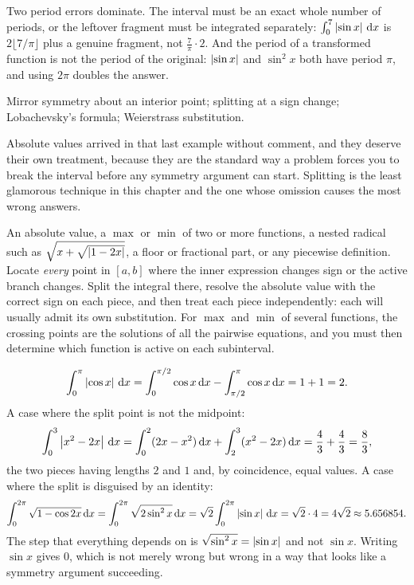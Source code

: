 \begin{trap}
Two period errors dominate. The interval must be an exact whole number of periods, or the leftover fragment must be integrated separately: $\int_0^{7}\left\lvert \sin x\right\rvert\,\mathrm{d} x$ is $2\lfloor7/\pi\rfloor$ plus a genuine fragment, not $\tfrac{7}{\pi}\cdot2$. And the period of a transformed function is not the period of the original: $\left\lvert \sin x\right\rvert$ and $\sin^{2}x$ both have period $\pi$, and using $2\pi$ doubles the answer.
\end{trap}

\begin{seealsob}Mirror symmetry about an interior point; splitting at a sign change; Lobachevsky's formula; Weierstrass substitution.\end{seealsob}

Absolute values arrived in that last example without comment, and they deserve their own treatment, because they are the standard way a problem forces you to break the interval before any symmetry argument can start. Splitting is the least glamorous technique in this chapter and the one whose omission causes the most wrong answers.

\cue An absolute value, a $\max$ or $\min$ of two or more functions, a nested radical such as $\sqrt{x+\sqrt{\left\lvert 1-2x\right\rvert}}$, a floor or fractional part, or any piecewise definition.
\method Locate \emph{every} point in $[a,b]$ where the inner expression changes sign or the active branch changes. Split the integral there, resolve the absolute value with the correct sign on each piece, and then treat each piece independently: each will usually admit its own substitution. For $\max$ and $\min$ of several functions, the crossing points are the solutions of all the pairwise equations, and you must then determine which function is active on each subinterval.

\begin{worked}
\[\int_0^{\pi}\left\lvert \cos x\right\rvert\,\mathrm{d} x=\int_0^{\pi/2}\cos x\,\mathrm{d} x-\int_{\pi/2}^{\pi}\cos x\,\mathrm{d} x=1+1=2.\]
A case where the split point is not the midpoint:
\[\int_0^{3}\left\lvert x^{2}-2x\right\rvert\,\mathrm{d} x=\int_0^{2}(2x-x^{2})\,\mathrm{d} x+\int_2^{3}(x^{2}-2x)\,\mathrm{d} x=\frac43+\frac43=\frac83,\]
the two pieces having lengths $2$ and $1$ and, by coincidence, equal values. A case where the split is disguised by an identity:
\[\int_0^{2\pi}\sqrt{1-\cos2x}\,\mathrm{d} x=\int_0^{2\pi}\sqrt{2\sin^{2}x}\,\mathrm{d} x=\sqrt2\int_0^{2\pi}\left\lvert \sin x\right\rvert\,\mathrm{d} x=\sqrt2\cdot4=4\sqrt2\approx5.656854.\]
The step that everything depends on is $\sqrt{\sin^{2}x}=\left\lvert \sin x\right\rvert$ and not $\sin x$. Writing $\sin x$ gives $0$, which is not merely wrong but wrong in a way that looks like a symmetry argument succeeding.
\end{worked}

